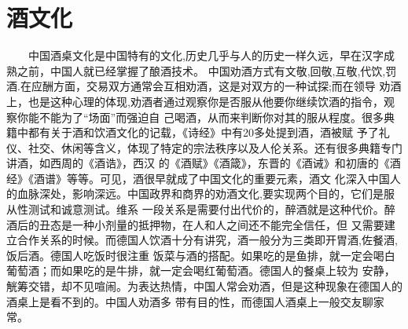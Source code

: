 \section{酒文化}
　　中国酒桌文化是中国特有的文化,历史几乎与人的历史一样久远，早在汉字成熟之前，中国人就已经掌握了酿酒技术。
中国劝酒方式有文敬,回敬,互敬,代饮,罚酒.在应酬方面，交易双方通常会互相劝酒，这是对双方的一种试探;而在领导
劝酒上，也是这种心理的体现,劝酒者通过观察你是否服从他要你继续饮酒的指令，观察你能不能为了“场面”而强迫自
己喝酒，从而来判断你对其的服从程度。很多典籍中都有关于酒和饮酒文化的记载，《诗经》中有20多处提到酒，酒被赋
予了礼仪、社交、休闲等含义，体现了特定的宗法秩序以及人伦关系。还有很多典籍专门讲酒，如西周的《酒诰》，西汉
的《酒赋》《酒箴》，东晋的《酒诫》和初唐的《酒经》《酒谱》等等。可见，酒很早就成了中国文化的重要元素，酒文
化深入中国人的血脉深处，影响深远。中国政界和商界的劝酒文化,要实现两个目的，它们是服从性测试和诚意测试。维系
一段关系是需要付出代价的，醉酒就是这种代价。醉酒后的丑态是一种小剂量的抵押物，在人和人之间还不能完全信任，但
又需要建立合作关系的时候。而德国人饮酒十分有讲究，酒一般分为三类即开胃酒,佐餐酒,饭后酒。德国人吃饭时很注重
饭菜与酒的搭配。如果吃的是鱼排，就一定会喝白葡萄酒；而如果吃的是牛排，就一定会喝红葡萄酒。德国人的餐桌上较为
安静，觥筹交错，却不见喧闹。为表达热情，中国人常会劝酒，但是这种现象在德国人的酒桌上是看不到的。中国人劝酒多
带有目的性，而德国人酒桌上一般交友聊家常。